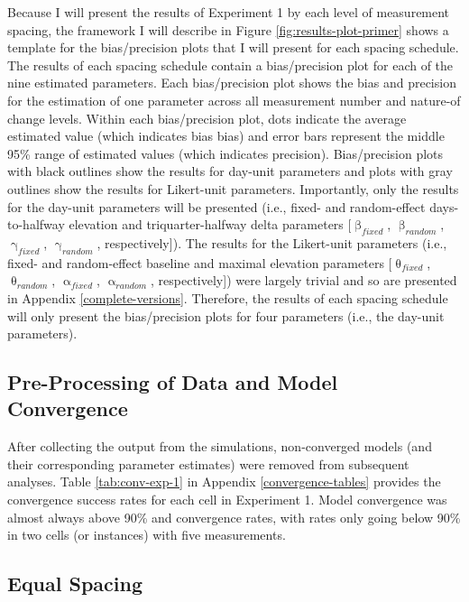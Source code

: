 \documentclass[
12pt, %
twoside,
english]{guelphthesis}
\begin{document}
Because I will present the results of Experiment 1 by each level of measurement spacing, the framework I will describe in Figure \ref{fig:results-plot-primer} shows a template for the bias/precision plots that I will present for each spacing schedule. The results of each spacing schedule contain a bias/precision plot for each of the nine estimated parameters. Each bias/precision plot shows the bias and precision for the estimation of one parameter across all measurement number and nature-of change levels. Within each bias/precision plot, dots indicate the average estimated value (which indicates bias bias) and error bars represent the middle 95\% range of estimated values (which indicates precision). Bias/precision plots with black outlines show the results for day-unit parameters and plots with gray outlines show the results for Likert-unit parameters. Importantly, only the results for the day-unit parameters will be presented (i.e., fixed- and random-effect days-to-halfway elevation and triquarter-halfway delta parameters {[}\(\upbeta_{fixed}\), \(\upbeta_{random}\), \(\upgamma_{fixed}\), \(\upgamma_{random}\), respectively{]}). The results for the Likert-unit parameters (i.e., fixed- and random-effect baseline and maximal elevation parameters {[}\(\uptheta_{fixed}\), \(\uptheta_{random}\), \(\upalpha_{fixed}\), \(\upalpha_{random}\), respectively{]}) were largely trivial and so are presented in Appendix \ref{complete-versions}. Therefore, the results of each spacing schedule will only present the bias/precision plots for four parameters (i.e., the day-unit parameters).

\hypertarget{pre-processing-of-data-and-model-convergence}{%
\subsection{Pre-Processing of Data and Model Convergence}\label{pre-processing-of-data-and-model-convergence}}

After collecting the output from the simulations, non-converged models (and their corresponding parameter estimates) were removed from subsequent analyses. Table \ref{tab:conv-exp-1} in Appendix \ref{convergence-tables} provides the convergence success rates for each cell in Experiment 1. Model convergence was almost always above 90\% and convergence rates, with rates only going below 90\% in two cells (or instances) with five measurements.

\hypertarget{concise-tab}{%
\subsection{Equal Spacing}\label{concise-tab}}
\end{document}
